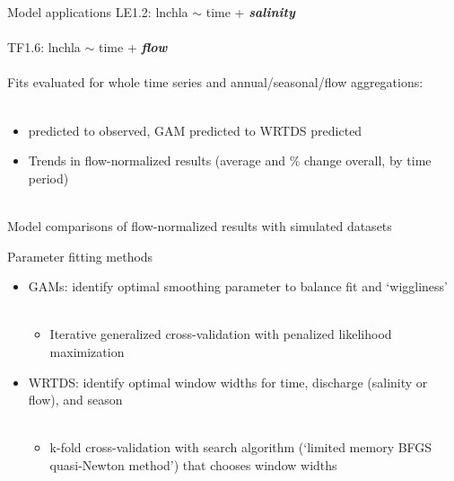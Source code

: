 \documentclass[serif]{beamer}\usepackage[]{graphicx}\usepackage[]{color}
\newcommand{\Bigtxt}[1]{\textbf{\textit{#1}}}
\begin{document}
\begin{frame}{Model applications}
LE1.2: lnchla $\sim$ time + \Bigtxt{salinity} \\~\\
TF1.6: lnchla $\sim$ time + \Bigtxt{flow} \\~\\
Fits evaluated for whole time series and annual/seasonal/flow aggregations: \\~\\
\begin{itemize}
\item predicted to observed, GAM predicted to WRTDS predicted
\item Trends in flow-normalized results (average and \% change overall, by time period) \\~\\
\end{itemize}
Model comparisons of flow-normalized results with simulated datasets
\end{frame}

\begin{frame}{Parameter fitting methods}
\begin{itemize}
\item GAMs: identify optimal smoothing parameter to balance fit and `wiggliness' \\~\\
\begin{itemize}
\item Iterative generalized cross-validation with penalized likelihood maximization
\end{itemize}
\end{itemize}
\begin{itemize}
\item WRTDS: identify optimal window widths for time, discharge (salinity or flow), and season \\~\\
\begin{itemize}
\item k-fold cross-validation with search algorithm (`limited memory BFGS quasi-Newton method') that chooses window widths
\end{itemize}
\end{itemize}
\end{frame}
\end{document}

